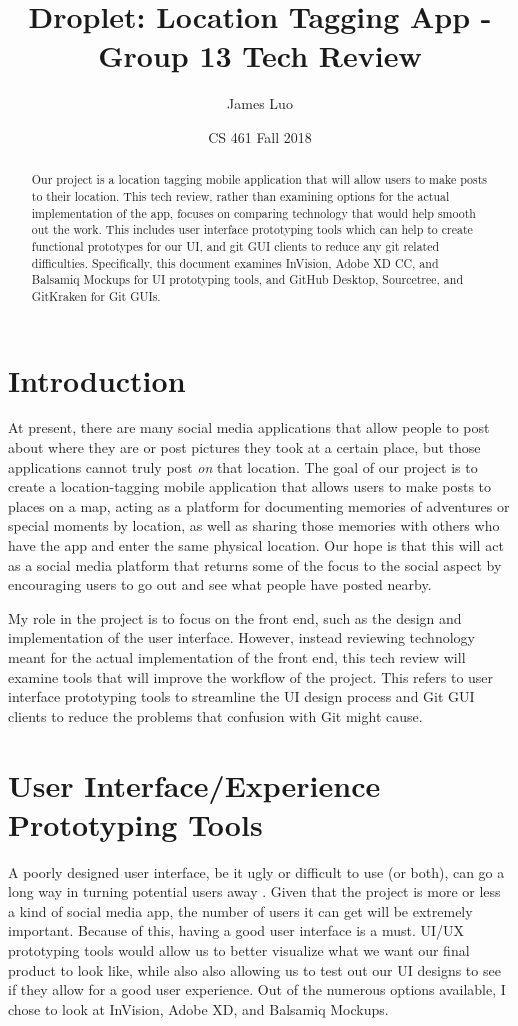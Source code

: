 \documentclass[10pt, letterpaper,draftclsnofoot,onecolumn, compsoc]{IEEEtran}
\title{Droplet: Location Tagging App - Group 13 Tech Review}
\author{James Luo}
\date{CS 461    Fall 2018}
\begin{document}
\begin{titlingpage}
    \maketitle
    \begin{abstract}
      Our project is a location tagging mobile application that will allow users to make posts to their location. This tech review, rather than examining options for the actual implementation of the app, focuses on comparing technology that would help smooth out the work. This includes user interface prototyping tools which can help to create functional prototypes for our UI, and git GUI clients to reduce any git related difficulties. Specifically, this document examines InVision, Adobe XD CC, and Balsamiq Mockups for UI prototyping tools, and GitHub Desktop, Sourcetree, and GitKraken for Git GUIs. 
    \end{abstract}
\end{titlingpage}


\section{Introduction}
At present, there are many social media applications that allow people to post about where they are or post pictures they took at a certain place, but those applications cannot truly post \textit{on} that location. The goal of our project is to create a location-tagging mobile application that allows users to make posts to places on a map, acting as a platform for documenting memories of adventures or special moments by location, as well as sharing those memories with others who have the app and enter the same physical location. Our hope is that this will act as a social media platform that returns some of the focus to the social aspect by encouraging users to go out and see what people have posted nearby. 

My role in the project is to focus on the front end, such as the design and implementation of the user interface. However, instead reviewing technology meant for the actual implementation of the front end, this tech review will examine tools that will improve the workflow of the project. This refers to user interface prototyping tools to streamline the UI design process and Git GUI clients to reduce the problems that confusion with Git might cause.

\section{User Interface/Experience Prototyping Tools}
A poorly designed user interface, be it ugly or difficult to use (or both), can go a long way in turning potential users away \cite{usability}. Given that the project is more or less a kind of social media app, the number of users it can get will be extremely important. Because of this, having a good user interface is a must. UI/UX prototyping tools would allow us to better visualize what we want our final product to look like, while also also allowing us to test out our UI designs to see if they allow for a good user experience. Out of the numerous options available, I chose to look at InVision, Adobe XD, and Balsamiq Mockups. 
\end{document}
